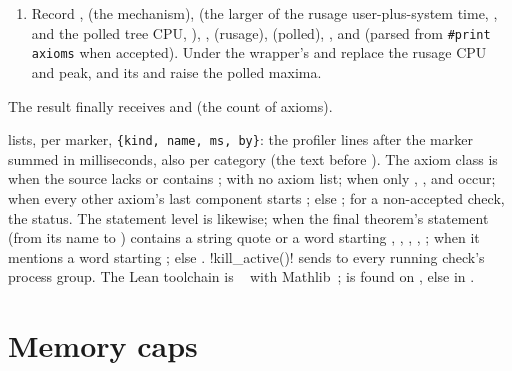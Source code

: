 \begin{algorithm}
\begin{enumerate}
  (\py!Cap.oom!),  with ; timer kill or
  , ; , ; exit 0 with no  in the
  output, ; an out-of-memory text (, ,
  ), ; else  with the first error line (300
  characters).
\item Record ,  (the mechanism),  (the
  larger of the rusage user-plus-system time, , and the polled tree CPU,
  ), ,  (rusage), 
  (polled), , and  (parsed from \texttt{\#print axioms} when accepted).
  Under  the wrapper's  and  replace the rusage CPU and
  peak, and its  and  raise the polled maxima.
\end{enumerate}
The result finally receives  and  (the count of
 axioms).
\end{algorithm}

 lists, per marker, \texttt{\{kind, name, ms, by\}}: the profiler lines
 after the marker summed in milliseconds, also per category (the text
before ). The axiom class is  when the source lacks  or contains ;  with no axiom list;
 when only , , and  occur;
 when every other axiom's last component starts ; else
; for a non-accepted check, the status. The statement level is 
likewise;  when the final theorem's statement (from its name to \code{:=}) contains
a string quote or a word starting , , , ,
;  when it mentions a word starting ; else
. \py!kill_active()! sends  to every running check's process group.
The Lean toolchain is ~\cite{demoura2021lean4} with
Mathlib~\cite{mathlib2020};  is found on , else in
.

\section{Memory caps}\label{sec:bench-memcap}

